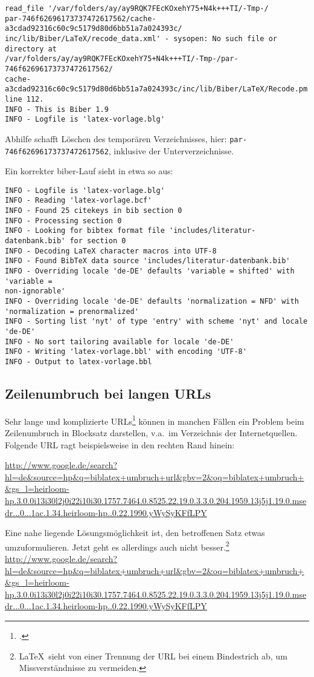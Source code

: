 {\small
\begin{verbatim}
read_file '/var/folders/ay/ay9RQK7FEcKOxehY75+N4k+++TI/-Tmp-/
par-746f62696173737472617562/cache-a3cdad92316c60c9c5179d80d6bb51a7a024393c/
inc/lib/Biber/LaTeX/recode_data.xml' - sysopen: No such file or directory at 
/var/folders/ay/ay9RQK7FEcKOxehY75+N4k+++TI/-Tmp-/par-746f62696173737472617562/
cache-a3cdad92316c60c9c5179d80d6bb51a7a024393c/inc/lib/Biber/LaTeX/Recode.pm 
line 112.
INFO - This is Biber 1.9
INFO - Logfile is 'latex-vorlage.blg'
\end{verbatim}
}

Abhilfe schafft Löschen des temporären Verzeichnisses, hier: \verb|par-746f62696173737472617562|, inklusive der Unterverzeichnisse.

Ein korrekter biber-Lauf sieht in etwa so aus:
{\small
\begin{verbatim}
INFO - Logfile is 'latex-vorlage.blg'
INFO - Reading 'latex-vorlage.bcf'
INFO - Found 25 citekeys in bib section 0
INFO - Processing section 0
INFO - Looking for bibtex format file 'includes/literatur-datenbank.bib' for section 0
INFO - Decoding LaTeX character macros into UTF-8
INFO - Found BibTeX data source 'includes/literatur-datenbank.bib'
INFO - Overriding locale 'de-DE' defaults 'variable = shifted' with 'variable = 
non-ignorable'
INFO - Overriding locale 'de-DE' defaults 'normalization = NFD' with 
'normalization = prenormalized'
INFO - Sorting list 'nyt' of type 'entry' with scheme 'nyt' and locale 'de-DE'
INFO - No sort tailoring available for locale 'de-DE'
INFO - Writing 'latex-vorlage.bbl' with encoding 'UTF-8'
INFO - Output to latex-vorlage.bbl 
\end{verbatim}
}

\subsection{Zeilenumbruch bei langen URLs}
Sehr lange und komplizierte URLs\footcite{langeURL} können in manchen Fällen ein Problem beim Zeilenumbruch in Blocksatz darstellen, v.a.\ im Verzeichnis der Internetquellen. Folgende URL ragt beispielsweise in den rechten Rand hinein: 

\url{http://www.google.de/search?hl=de&source=hp&q=biblatex+umbruch+url&gbv=2&oq=biblatex+umbruch+&gs_l=heirloom-hp.3.0.0i13i30l2j0i22i10i30.1757.7464.0.8525.22.19.0.3.3.0.204.1959.13j5j1.19.0.msedr...0...1ac.1.34.heirloom-hp..0.22.1990.yWySyKFfLPY}

Eine nahe liegende Lösungsmöglichkeit ist, den betroffenen Satz etwas umzuformulieren.
Jetzt geht es allerdings auch nicht besser.\footnote{%
\LaTeX\ sieht von einer Trennung der URL bei einem Bindestrich ab, um Missverständnisse zu vermeiden.
}
\url{http://www.google.de/search?hl=de&source=hp&q=biblatex+umbruch+url&gbv=2&oq=biblatex+umbruch+&gs_l=heirloom-hp.3.0.0i13i30l2j0i22i10i30.1757.7464.0.8525.22.19.0.3.3.0.204.1959.13j5j1.19.0.msedr...0...1ac.1.34.heirloom-hp..0.22.1990.yWySyKFfLPY}

